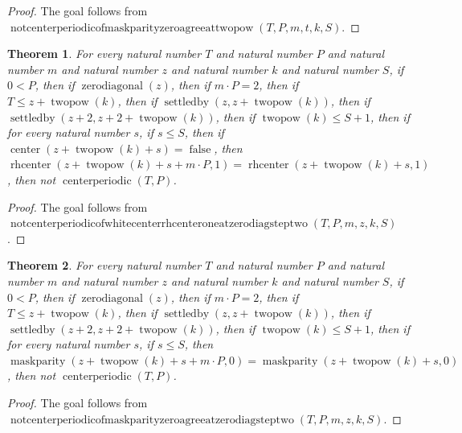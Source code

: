 \documentclass[11pt]{article}
\newtheorem{theorem}{Theorem}[section]
\theoremstyle{definition}
\begin{document}
\begin{proof}
The goal follows from \(\operatorname{notcenterperiodicofmaskparityzeroagreeattwopow}(T, P, m, t, k, S)\).
\end{proof}
\begin{theorem}
\label{ll:paper:not-centerperiodic-of-white-center-rhcenter-one-at-zero-diag-step-two}
For every natural number \(T\) and natural number \(P\) and natural number \(m\) and natural number \(z\) and natural number \(k\) and natural number \(S\), if \(0 < P\), then if \(\operatorname{zerodiagonal}(z)\), then if \(m \cdot P = 2\), then if \(T \le z + \operatorname{twopow}(k)\), then if \(\operatorname{settledby}(z, z + \operatorname{twopow}(k))\), then if \(\operatorname{settledby}(z + 2, z + 2 + \operatorname{twopow}(k))\), then if \(\operatorname{twopow}(k) \le S + 1\), then if for every natural number \(s\), if \(s \le S\), then if \(\operatorname{center}(z + \operatorname{twopow}(k) + s) = \operatorname{false}\), then \(\operatorname{rhcenter}(z + \operatorname{twopow}(k) + s + m \cdot P, 1) = \operatorname{rhcenter}(z + \operatorname{twopow}(k) + s, 1)\), then not \(\operatorname{centerperiodic}(T, P)\).
\end{theorem}
\begin{proof}
The goal follows from \(\operatorname{notcenterperiodicofwhitecenterrhcenteroneatzerodiagsteptwo}(T, P, m, z, k, S)\).
\end{proof}
\begin{theorem}
\label{ll:paper:not-centerperiodic-of-maskparity-zero-agree-at-zero-diag-step-two}
For every natural number \(T\) and natural number \(P\) and natural number \(m\) and natural number \(z\) and natural number \(k\) and natural number \(S\), if \(0 < P\), then if \(\operatorname{zerodiagonal}(z)\), then if \(m \cdot P = 2\), then if \(T \le z + \operatorname{twopow}(k)\), then if \(\operatorname{settledby}(z, z + \operatorname{twopow}(k))\), then if \(\operatorname{settledby}(z + 2, z + 2 + \operatorname{twopow}(k))\), then if \(\operatorname{twopow}(k) \le S + 1\), then if for every natural number \(s\), if \(s \le S\), then \(\operatorname{maskparity}(z + \operatorname{twopow}(k) + s + m \cdot P, 0) = \operatorname{maskparity}(z + \operatorname{twopow}(k) + s, 0)\), then not \(\operatorname{centerperiodic}(T, P)\).
\end{theorem}
\begin{proof}
The goal follows from \(\operatorname{notcenterperiodicofmaskparityzeroagreeatzerodiagsteptwo}(T, P, m, z, k, S)\).
\end{proof}
\end{document}
